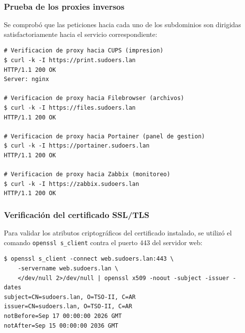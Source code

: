 
\subsubsection{Prueba de los proxies inversos}

Se comprobó que las peticiones hacia cada uno de los subdominios son dirigidas
satisfactoriamente hacia el servicio correspondiente:

\begin{lstlisting}[style=terminal]
# Verificacion de proxy hacia CUPS (impresion)
$ curl -k -I https://print.sudoers.lan
HTTP/1.1 200 OK
Server: nginx

# Verificacion de proxy hacia Filebrowser (archivos)
$ curl -k -I https://files.sudoers.lan
HTTP/1.1 200 OK

# Verificacion de proxy hacia Portainer (panel de gestion)
$ curl -k -I https://portainer.sudoers.lan
HTTP/1.1 200 OK

# Verificacion de proxy hacia Zabbix (monitoreo)
$ curl -k -I https://zabbix.sudoers.lan
HTTP/1.1 200 OK
\end{lstlisting}


\subsubsection{Verificación del certificado SSL/TLS}

Para validar los atributos criptográficos del certificado instalado, se utilizó
el comando \texttt{openssl s\_client} contra el puerto 443 del servidor web:

\begin{lstlisting}[style=terminal]
$ openssl s_client -connect web.sudoers.lan:443 \
    -servername web.sudoers.lan \
    </dev/null 2>/dev/null | openssl x509 -noout -subject -issuer -dates
subject=CN=sudoers.lan, O=TSO-II, C=AR
issuer=CN=sudoers.lan, O=TSO-II, C=AR
notBefore=Sep 17 00:00:00 2026 GMT
notAfter=Sep 15 00:00:00 2036 GMT
\end{lstlisting}

